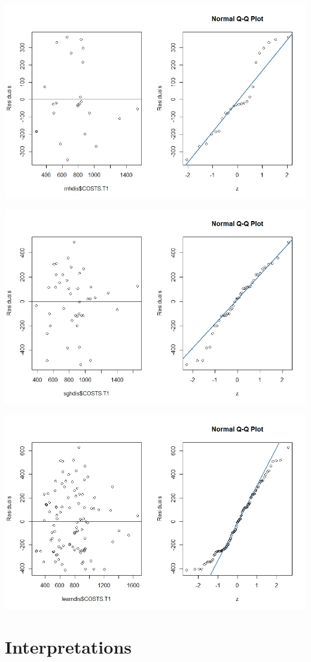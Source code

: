 \documentclass[]{article}
\begin{document}
\centering
\includegraphics[width=\textwidth]{RStudio/jpeg/Res_RNH.jpeg}
\raggedright


\centering
\includegraphics[width=\textwidth]{RStudio/jpeg/Res_SGH.jpeg}
\raggedright


\centering
\includegraphics[width=\textwidth]{RStudio/jpeg/Res_COST.jpeg}
\raggedright

\section{Interpretations}
\end{document}
